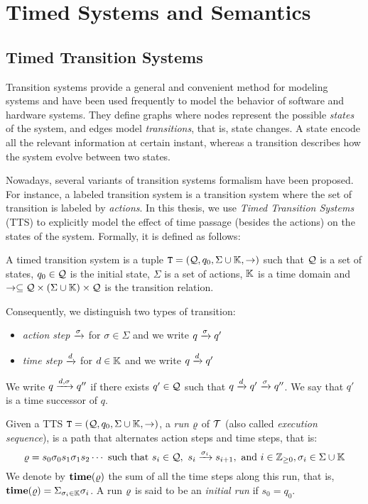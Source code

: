 \chapter{Timed Systems and Semantics}\label{chap:2} 
\minitoc
\section{Timed Transition Systems}
Transition systems provide a general and convenient method for modeling 
systems and have been used frequently to model the behavior of 
software and hardware systems. They define graphs where nodes
represent the possible \emph{states} of the system, and edges model 
\emph{transitions}, that is, state changes. A state encode all the relevant 
information at certain instant, whereas a transition describes how the system
evolve between two states. 

Nowadays, several variants of transition systems formalism have been 
proposed. For instance, a labeled transition system is a transition system
where the set of transition is labeled by \emph{actions}.
In this thesis, we use \emph{Timed Transition Systems} (TTS)
to explicitly model the effect of time passage (besides the actions)
on the states of the system. Formally, it is defined as follows:  

\begin{definition}\label{def:tts}
  A timed transition system is a tuple $\texttt{T}=(\mathcal{Q},q_0,\Sigma\cup\mathbb{K},\to)$ such that $\mathcal{Q}$ is 
  a set of states, $q_0\in\mathcal{Q}$ is the initial state, $\Sigma$ is a set of
  actions, $\mathbb{K}$ is a time domain and $\to\subseteq\mathcal{Q}\times
  (\Sigma\cup\mathbb{K})\times\mathcal{Q}$ is the transition relation.
\end{definition}
Consequently, we distinguish two types of transition:
\begin{itemize}
  \item \emph{action step} $\xrightarrow{\sigma}$ for $\sigma\in\Sigma$ and we write 
    $q\xrightarrow{\sigma}q'$ 
  \item \emph{time step} $\xrightarrow{d}$ for $d\in\mathbb{K}$ and we write $q\xrightarrow{d}q'$ 
\end{itemize}
We write $q\xrightarrow{d,\sigma}q''$ if there exists $q'\in\mathcal{Q}$
such that $q\xrightarrow{d}q'\xrightarrow{\sigma}q''$. We say that $q'$ is
a time successor of $q$.

Given a TTS $\texttt{T}=(\mathcal{Q},q_0,\Sigma\cup\mathbb{K},\to)$, a \emph{run} $\varrho$ of $\mathcal{T}$ (also called 
\emph{execution sequence}), is a path that alternates action steps and 
time steps, that is:
\begin{displaymath}
  \varrho=s_0\sigma_0 s_1\sigma_1 s_2\cdots \text{ such that } 
  s_i\in\mathcal{Q}, \  s_i\xrightarrow{\sigma_{i}}s_{i+1},\text{ and } 
  i\in\mathbb{Z}_{\ge 0},\sigma_i\in\Sigma\cup\mathbb{K}
\end{displaymath}
We denote by $\mathbf{time(\varrho)}$ the sum of all the time steps along this run,
that is, $\mathbf{time(\varrho)}=\Sigma_{\sigma_i\in\mathbb{K}}\sigma_i$. 
A run $\varrho$ is said to be an \emph{initial run} if $s_0=q_0$. 


